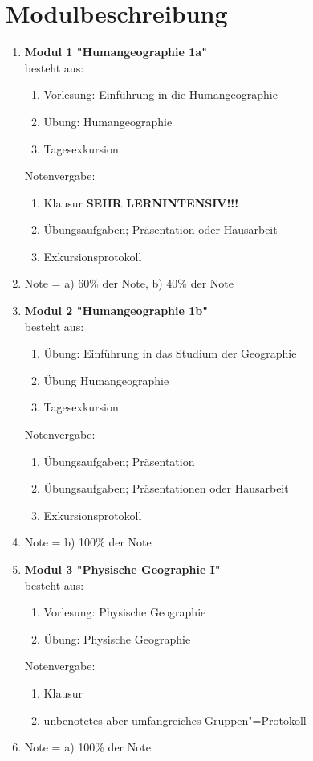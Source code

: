 \section{Modulbeschreibung}
\begin{enumerate}
 \item \textbf{Modul 1 "Humangeographie 1a"}\\ besteht aus:
  \begin{enumerate}
   \item Vorlesung: Einführung in die Humangeographie
   \item Übung: Humangeographie
   \item Tagesexkursion
  \end{enumerate}
  Notenvergabe:
  \begin{enumerate}
   \item Klausur \textbf{SEHR LERNINTENSIV!!!}
   \item Übungsaufgaben; Präsentation oder Hausarbeit
   \item Exkursionsprotokoll
  \end{enumerate}    %
  \item[] Note = a) 60\% der Note, b) 40\% der Note

 \item \textbf{Modul 2 "Humangeographie 1b"} \\ besteht aus:
  \begin{enumerate}
   \item Übung: Einführung in das Studium der Geographie
   \item Übung Humangeographie
   \item Tagesexkursion
  \end{enumerate}
  Notenvergabe:
  \begin{enumerate}
   \item Übungsaufgaben; Präsentation
   \item Übungsaufgaben; Präsentationen oder Hausarbeit
   \item Exkursionsprotokoll
  \end{enumerate}
  \item[] Note = b) 100\% der Note

 \item \textbf{Modul 3 "Physische Geographie I"}  \\ besteht aus:
  \begin{enumerate}
   \item Vorlesung: Physische Geographie
   \item Übung: Physische Geographie
  \end{enumerate}
  Notenvergabe:
  \begin{enumerate}
   \item Klausur
   \item unbenotetes aber umfangreiches Gruppen"=Protokoll
  \end{enumerate}
  \item[] Note = a) 100\% der Note


\end{enumerate}
